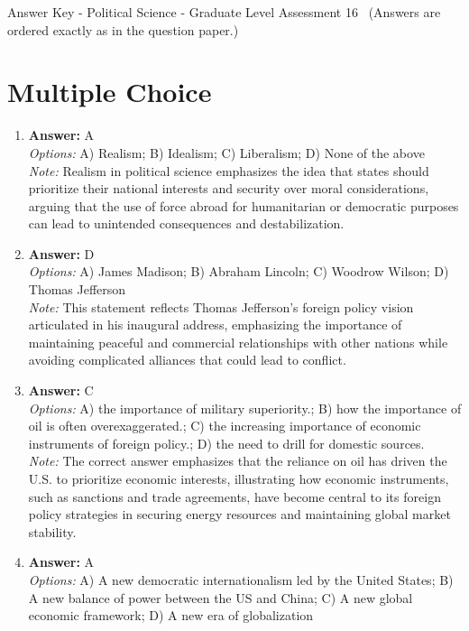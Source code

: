 \documentclass[12pt]{article}
\begin{document}
\begin{center}
Answer Key - Political Science - Graduate Level Assessment 16 \
\small (Answers are ordered exactly as in the question paper.)
\end{center}

\section*{Multiple Choice}
\begin{enumerate}[label=\arabic*.]
\item \textbf{Answer:} A
\\ \textit{Options:} A) Realism; B) Idealism; C) Liberalism; D) None of the above
\\ \textit{Note:} Realism in political science emphasizes the idea that states should prioritize their national interests and security over moral considerations, arguing that the use of force abroad for humanitarian or democratic purposes can lead to unintended consequences and destabilization.
\item \textbf{Answer:} D
\\ \textit{Options:} A) James Madison; B) Abraham Lincoln; C) Woodrow Wilson; D) Thomas Jefferson
\\ \textit{Note:} This statement reflects Thomas Jefferson's foreign policy vision articulated in his inaugural address, emphasizing the importance of maintaining peaceful and commercial relationships with other nations while avoiding complicated alliances that could lead to conflict.
\item \textbf{Answer:} C
\\ \textit{Options:} A) the importance of military superiority.; B) how the importance of oil is often overexaggerated.; C) the increasing importance of economic instruments of foreign policy.; D) the need to drill for domestic sources.
\\ \textit{Note:} The correct answer emphasizes that the reliance on oil has driven the U.S. to prioritize economic interests, illustrating how economic instruments, such as sanctions and trade agreements, have become central to its foreign policy strategies in securing energy resources and maintaining global market stability.
\item \textbf{Answer:} A
\\ \textit{Options:} A) A new democratic internationalism led by the United States; B) A new balance of power between the US and China; C) A new global economic framework; D) A new era of globalization

\end{enumerate}
\end{document}
